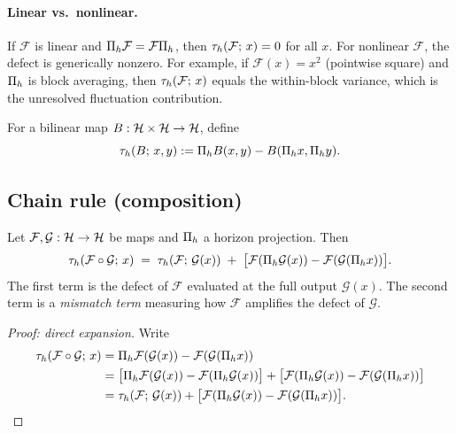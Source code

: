 \paragraph{Linear vs.\ nonlinear.}
If $\mathcal{F}$ is linear and $\Pi_{h} \mathcal{F} = \mathcal{F} \Pi_{h}$, then $\tau_{h}(\mathcal{F};\, x) = 0$ for all $x$.
For nonlinear $\mathcal{F}$, the defect is generically nonzero.
For example, if $\mathcal{F}(x) = x^2$ (pointwise square) and $\Pi_{h}$ is
block averaging, then $\tau_{h}(\mathcal{F};\, x)$ equals the within-block
variance, which is the unresolved fluctuation contribution.

\begin{definition}
\label{def:bilinear-defect}
For a bilinear map $B:\mathcal{H} \times \mathcal{H} \to \mathcal{H}$, define
\[
\tau_{h}(B;\, x, y) := \Pi_{h} B(x,y) - B(\Pi_{h} x, \Pi_{h} y).
\]
\end{definition}

\subsection{Chain rule (composition)}

\begin{proposition}
\label{prop:chain-rule}
Let $\mathcal{F},\mathcal{G}:\mathcal{H} \to \mathcal{H}$ be maps and $\Pi_{h}$ a horizon projection.
Then
\[
\tau_{h}(\mathcal{F} \circ \mathcal{G};\, x)
\;=\;
\tau_{h}(\mathcal{F};\, \mathcal{G}(x)) \;+\; \bigl[ \mathcal{F}(\Pi_{h} \mathcal{G}(x)) - \mathcal{F}(\mathcal{G}(\Pi_{h} x)) \bigr].
\]
The first term is the defect of $\mathcal{F}$ evaluated at the full output $\mathcal{G}(x)$.
The second term is a \emph{mismatch term} measuring how $\mathcal{F}$ amplifies the defect of $\mathcal{G}$.
\end{proposition}

\begin{proof}[Proof: direct expansion]
Write
\begin{align*}
\tau_{h}(\mathcal{F} \circ \mathcal{G};\, x)
&= \Pi_{h} \mathcal{F}(\mathcal{G}(x)) - \mathcal{F}(\mathcal{G}(\Pi_{h} x)) \\
&= \bigl[\Pi_{h} \mathcal{F}(\mathcal{G}(x)) - \mathcal{F}(\Pi_{h} \mathcal{G}(x))\bigr] + \bigl[\mathcal{F}(\Pi_{h} \mathcal{G}(x)) - \mathcal{F}(\mathcal{G}(\Pi_{h} x))\bigr] \\
&= \tau_{h}(\mathcal{F};\, \mathcal{G}(x)) + \bigl[\mathcal{F}(\Pi_{h} \mathcal{G}(x)) - \mathcal{F}(\mathcal{G}(\Pi_{h} x))\bigr]. \qedhere
\end{align*}
\end{proof}

